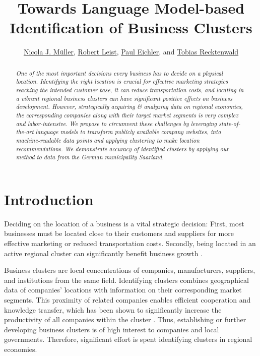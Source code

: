 \documentclass[12pt]{article}
\author{\small \href{mailto:s8namuel@stud.uni-saarland.de}{Nicola J. Müller}, \href{s8roleis@stud.uni-saarland.de}{Robert Leist}, \href{mailto:s8pleich@uni-saarland.de}{Paul Eichler}, and \href{mailto:s8tsreck@stud.uni-saarland.de}{Tobias Recktenwald}}
\title{\vspace{-3cm}Towards Language Model-based Identification of Business Clusters}
\date{}
\begin{document}
	
    \maketitle

   \begin{abstract}
	
	\textit{\small
	One of the most important decisions every business has to decide on a physical location. Identifying the right location is crucial for effective marketing strategies reaching the intended customer base, it can reduce transportation costs, and locating in a vibrant regional business clusters can have significant positive effects on business development.
	However, strategically acquiring \& analyzing data on regional economies, the corresponding companies along with their target market segments is very complex and labor-intensive.}
	\textit{\small
	We propose to circumvent these challenges by leveraging state-of-the-art language models to transform publicly available company websites, into machine-readable data points and  applying clustering to make location recommendations. We demonstrate accuracy of identified clusters by applying our method to data from the German municipality Saarland.
	}
   \end{abstract}
   
   
   \section{Introduction}
   Deciding on the location of a business is a vital strategic decision: First, most businesses must be located close to their customers and suppliers for more effective marketing or reduced transportation costs. Secondly, being located in an active regional cluster can significantly benefit business growth \cite{clustersandcomp,gems-model, regionaladv, clustertheory}. 
   
   Business clusters are local concentrations of companies, manufacturers, suppliers, and institutions from the same field. Identifying clusters combines geographical data of companies' locations with information on their corresponding market segments. This proximity of related companies enables efficient cooperation and knowledge transfer, which has been shown to significantly increase the productivity of all companies within the cluster \cite{clustersandcomp,gems-model, regionaladv, clustertheory}. Thus, establishing or further developing business clusters is of high interest to companies and local governments. Therefore, significant effort is spent identifying clusters in regional economies. 
   
\end{document}
